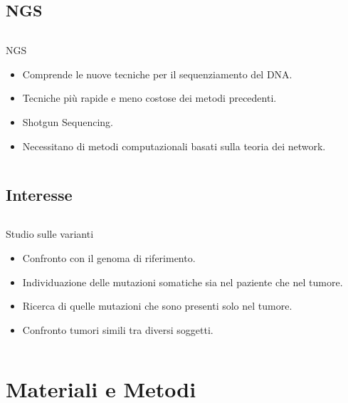 \documentclass{beamer}
\begin{document}
\subsection{NGS}
\begin{frame}
\begin{columns}
\begin{column}{0.8\linewidth}
\begin{block}{NGS}
\begin{itemize}
\item Comprende le nuove tecniche per il sequenziamento del 
DNA.
\item Tecniche più rapide e meno costose dei metodi precedenti.
\item Shotgun Sequencing.
\item Necessitano di metodi computazionali basati sulla teoria dei network.
\end{itemize}
\end{block}
\end{column}
\end{columns}
\end{frame}

\subsection{Interesse}
\begin{frame}
\begin{columns}
\begin{column}{0.8\linewidth}
\begin{block}{Studio sulle varianti}
\begin{itemize}
\item Confronto con il genoma di riferimento.
\item Individuazione delle mutazioni somatiche sia nel paziente che nel tumore.
\item Ricerca di quelle mutazioni che sono presenti solo nel tumore.
\item Confronto tumori simili tra diversi soggetti.
\end{itemize}
\end{block}
\end{column}
\end{columns}
\end{frame}

\section{Materiali e Metodi}
\end{document}
